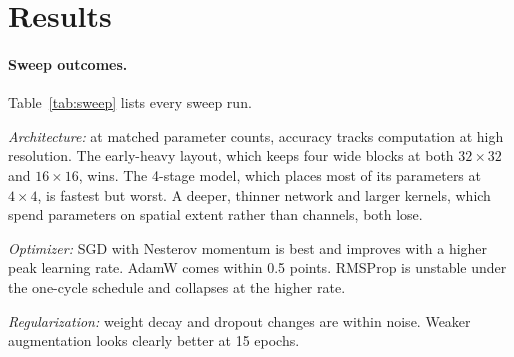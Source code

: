 \documentclass[letterpaper]{article} %
\begin{document}
\section{Results}

\paragraph{Sweep outcomes.}
Table~\ref{tab:sweep} lists every sweep run.

\emph{Architecture:} at matched parameter counts, accuracy tracks computation at high resolution. The early-heavy layout, which keeps four wide blocks at both $32\times32$ and $16\times16$, wins. The 4-stage model, which places most of its parameters at $4\times4$, is fastest but worst. A deeper, thinner network and larger kernels, which spend parameters on spatial extent rather than channels, both lose.

\emph{Optimizer:} SGD with Nesterov momentum is best and improves with a higher peak learning rate. AdamW comes within 0.5 points. RMSProp is unstable under the one-cycle schedule and collapses at the higher rate.

\emph{Regularization:} weight decay and dropout changes are within noise. Weaker augmentation looks clearly better at 15 epochs.
\end{document}
